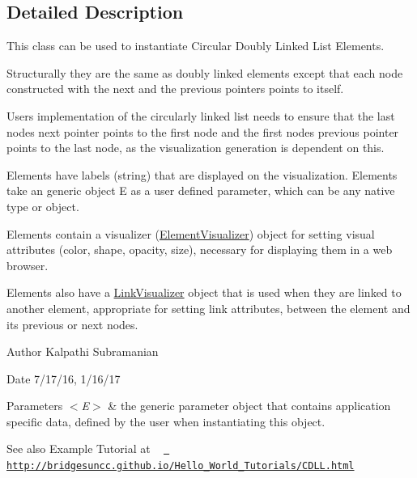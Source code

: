 \subsection{Detailed Description}
This class can be used to instantiate Circular Doubly Linked List Elements. 

Structurally they are the same as doubly linked elements except that each node constructed with the next and the previous pointers points to itself.

User\textquotesingle{}s implementation of the circularly linked list needs to ensure that the last node\textquotesingle{}s next pointer points to the first node and the first node\textquotesingle{}s previous pointer points to the last node, as the visualization generation is dependent on this.

Elements have labels (string) that are displayed on the visualization. Elements take an generic object E as a user defined parameter, which can be any native type or object.

Elements contain a visualizer (\mbox{\hyperlink{classbridges_1_1base_1_1_element_visualizer}{Element\+Visualizer}}) object for setting visual attributes (color, shape, opacity, size), necessary for displaying them in a web browser.

Elements also have a \mbox{\hyperlink{classbridges_1_1base_1_1_link_visualizer}{Link\+Visualizer}} object that is used when they are linked to another element, appropriate for setting link attributes, between the element and its previous or next nodes.

\begin{DoxyAuthor}{Author}
Kalpathi Subramanian
\end{DoxyAuthor}
\begin{DoxyDate}{Date}
7/17/16, 1/16/17
\end{DoxyDate}

\begin{DoxyParams}{Parameters}
{\em $<$\+E$>$} & the generic parameter object that contains application specific data, defined by the user when instantiating this object.\\
\hline
\end{DoxyParams}
\begin{DoxySeeAlso}{See also}
Example Tutorial at ~\newline
 \href{http://bridgesuncc.github.io/Hello_World_Tutorials/CDLL.html}{\texttt{ http\+://bridgesuncc.\+github.\+io/\+Hello\+\_\+\+World\+\_\+\+Tutorials/\+C\+D\+L\+L.\+html}} 
\end{DoxySeeAlso}



